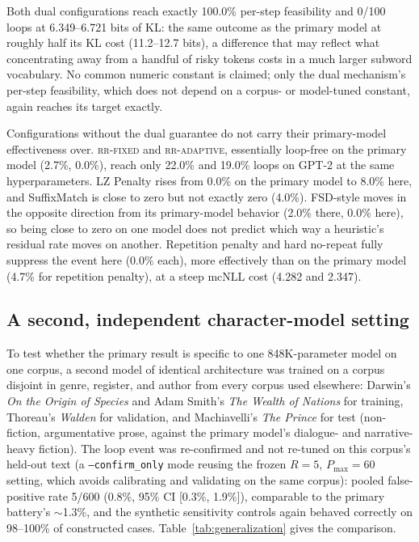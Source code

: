 Both dual configurations reach exactly 100.0\% per-step feasibility and 0/100 loops at 6.349--6.721 bits of KL: the same outcome as the primary model at roughly half its KL cost (11.2--12.7 bits), a difference that may reflect what concentrating away from a handful of risky tokens costs in a much larger subword vocabulary. No common numeric constant is claimed; only the dual mechanism's per-step feasibility, which does not depend on a corpus- or model-tuned constant, again reaches its target exactly.

Configurations without the dual guarantee do not carry their primary-model effectiveness over. \textsc{rr-fixed} and \textsc{rr-adaptive}, essentially loop-free on the primary model (2.7\%, 0.0\%), reach only 22.0\% and 19.0\% loops on GPT-2 at the same hyperparameters. LZ Penalty rises from 0.0\% on the primary model to 8.0\% here, and SuffixMatch is close to zero but not exactly zero (4.0\%). FSD-style moves in the opposite direction from its primary-model behavior (2.0\% there, 0.0\% here), so being close to zero on one model does not predict which way a heuristic's residual rate moves on another. Repetition penalty and hard no-repeat fully suppress the event here (0.0\% each), more effectively than on the primary model (4.7\% for repetition penalty), at a steep mcNLL cost (4.282 and 2.347).

\subsection{A second, independent character-model setting}
To test whether the primary result is specific to one 848K-parameter model on one corpus, a second model of identical architecture was trained on a corpus disjoint in genre, register, and author from every corpus used elsewhere: Darwin's \emph{On the Origin of Species} and Adam Smith's \emph{The Wealth of Nations} for training, Thoreau's \emph{Walden} for validation, and Machiavelli's \emph{The Prince} for test (non-fiction, argumentative prose, against the primary model's dialogue- and narrative-heavy fiction). The loop event was re-confirmed and not re-tuned on this corpus's held-out text (a \texttt{--confirm\_\allowbreak{}only} mode reusing the frozen $R{=}5$, $P_{\max}{=}60$ setting, which avoids calibrating and validating on the same corpus): pooled false-positive rate 5/600 (0.8\%, 95\% CI [0.3\%, 1.9\%]), comparable to the primary battery's $\sim$1.3\%, and the synthetic sensitivity controls again behaved correctly on 98--100\% of constructed cases. Table~\ref{tab:generalization} gives the comparison.


